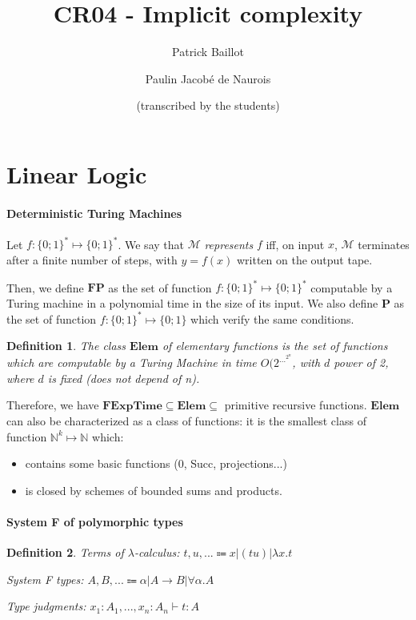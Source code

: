 \documentclass[a4paper,10pt]{article}
\author{Patrick Baillot \and Paulin Jacobé de Naurois \and (transcribed by the students)}
\title{CR04 - Implicit complexity}
\newcommand{\impl}{\rightarrow}	%
\newcommand{\Nset}{\mathbb{N}} %
\newcommand{\Mnice}{\mathcal{M}}			 %
\newcommand{\clFP}{\textbf{FP}}				 %
\newcommand{\clP}{\textbf{P}}				 %
\newcommand{\clElem}{\textbf{Elem}}			 %
\newcommand{\clFExpT}{\textbf{FExpTime}}	 %
\newtheorem{definition}{Definition}
\begin{document}
\maketitle

\part{Linear Logic}

\subsection{Deterministic Turing Machines}

\par Let $f:\{0;1\}^{*} \mapsto \{0;1\}^{*}$. We say that $\Mnice$ \emph{represents} $f$ iff, on input $x$, $\Mnice$ terminates after a finite number of steps, with $y=f(x)$ written on the output tape.

\par Then, we define $\clFP$ as the set of function $f:\{0;1\}^{*} \mapsto \{0;1\}^{*}$ computable by a Turing machine in a polynomial time in the size of its input. We also define $\clP$ as the set of function $f:\{0;1\}^{*} \mapsto \{0;1\}$ which verify the same conditions.

\begin{definition}
The class $\clElem$ of \emph{elementary functions} is the set of functions which are computable by a Turing Machine in time $O(2^{\dots ^{2^n}}$, with $d$ power of 2, where $d$ is fixed (does not depend of n).
\end{definition}

\par Therefore, we have $\clFExpT \subseteq \clElem \subseteq$ primitive recursive functions. $\clElem$ can also be characterized as a class of functions: it is the smallest class of function $\Nset^{k} \mapsto \Nset$ which:
\begin{itemize}
\item contains some basic functions (0, Succ, projections...)
\item is closed by schemes of bounded sums and products.
\end{itemize}



\subsection{System F of polymorphic types}

\begin{definition}
\item Terms of $\lambda$-calculus: $t,u,... \Coloneqq x | (t u) | \lambda x.t$
\item System F types: $A,B,... \Coloneqq \alpha | A\impl B | \forall \alpha .A $
\item Type judgments: $x_1:A_1, ..., x_n:A_n \vdash t:A$
\end{definition}
\end{document}
